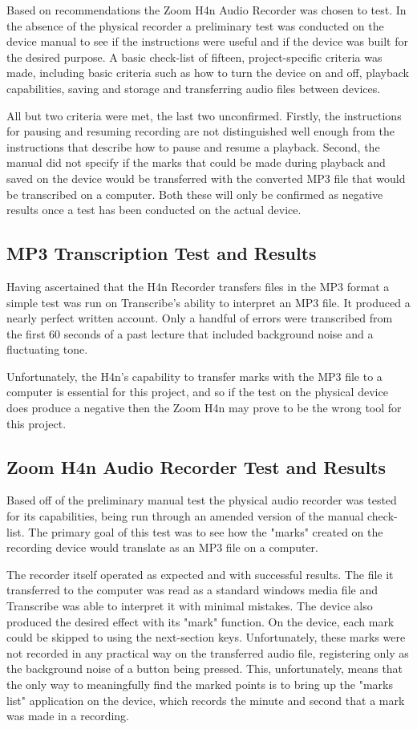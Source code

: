 \documentclass{article}
\begin{document}
Based on recommendations the Zoom H4n Audio Recorder was chosen to test. In the absence of the physical recorder a preliminary test was conducted on the device manual to see if the instructions were useful and if the device was built for the desired purpose. A basic check-list of fifteen, project-specific criteria was made, including basic criteria such as how to turn the device on and off, playback capabilities, saving and storage and transferring audio files between devices. 
	
    All but two criteria were met, the last two unconfirmed. Firstly, the instructions for pausing and resuming recording are not distinguished well enough from the instructions that describe how to pause and resume a playback. Second, the manual did not specify if the marks that could be made during playback and saved on the device would be transferred with the converted MP3 file that would be transcribed on a computer. Both these will only be confirmed as negative results once a test has been conducted on the actual device. 
    
\subsection{MP3 Transcription Test and Results}
Having ascertained that the H4n Recorder transfers files in the MP3 format a simple test was run on Transcribe's ability to interpret an MP3 file. It produced a nearly perfect written account. Only a handful of errors were transcribed from the first 60 seconds of a past lecture that included background noise and a fluctuating tone. 
	
    Unfortunately, the H4n's capability to transfer marks with the MP3 file to a computer is essential for this project, and so if the test on the physical device does produce a negative then the Zoom H4n may prove to be the wrong tool for this project.
    
\subsection{Zoom H4n Audio Recorder Test and Results}
Based off of the preliminary manual test the physical audio recorder was tested for its capabilities, being run through an amended version of the manual check-list. The primary goal of this test was to see how the "marks" created on the recording device would translate as an MP3 file on a computer. 
	
    The recorder itself operated as expected and with successful results. The file it transferred to the computer was read as a standard windows media file and Transcribe was able to interpret it with minimal mistakes. The device also produced the desired effect with its "mark" function. On the device, each mark could be skipped to using the next-section keys. Unfortunately, these marks were not recorded in any practical way on the transferred audio file, registering only as the background noise of a button being pressed. This, unfortunately, means that the only way to meaningfully find the marked points is to bring up the "marks list" application on the device, which records the minute and second that a mark was made in a recording.
    
\end{document}
